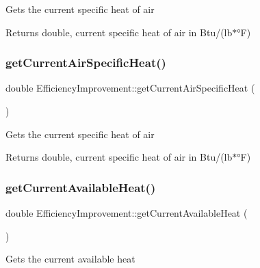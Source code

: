 Gets the current specific heat of air

\begin{DoxyReturn}{Returns}
double, current specific heat of air in Btu/(lb$\ast$°F) 
\end{DoxyReturn}
\mbox{\label{class_efficiency_improvement_a0d8b0d8968802a7994784380be376dfb}} 
\subsubsection{\texorpdfstring{get\+Current\+Air\+Specific\+Heat()}{getCurrentAirSpecificHeat()}\hspace{0.1cm}{\footnotesize\ttfamily [3/3]}}
{\footnotesize\ttfamily double Efficiency\+Improvement\+::get\+Current\+Air\+Specific\+Heat (\begin{DoxyParamCaption}{ }\end{DoxyParamCaption})}

Gets the current specific heat of air

\begin{DoxyReturn}{Returns}
double, current specific heat of air in Btu/(lb$\ast$°F) 
\end{DoxyReturn}
\mbox{\label{class_efficiency_improvement_a4f1ef470ee88c9d3ac05be0bd5755157}} 
\subsubsection{\texorpdfstring{get\+Current\+Available\+Heat()}{getCurrentAvailableHeat()}\hspace{0.1cm}{\footnotesize\ttfamily [1/3]}}
{\footnotesize\ttfamily double Efficiency\+Improvement\+::get\+Current\+Available\+Heat (\begin{DoxyParamCaption}{ }\end{DoxyParamCaption})}

Gets the current available heat

